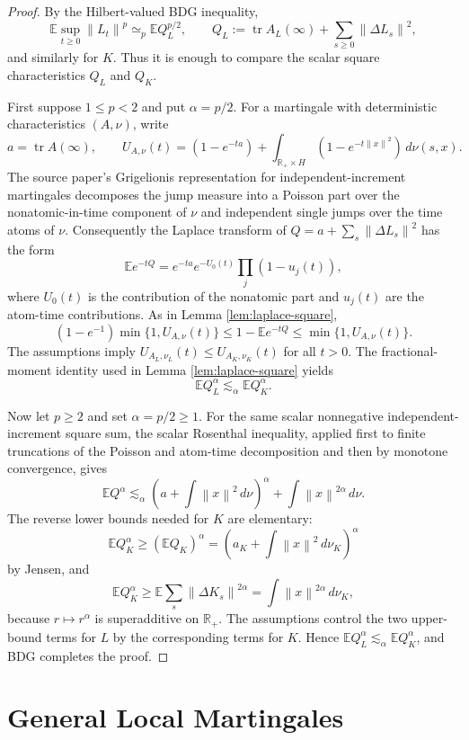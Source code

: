 \documentclass[11pt]{article}
\newcommand{\E}{\mathbb E}
\newcommand{\norm}[1]{\left\lVert #1\right\rVert}
\newcommand{\simequiv}{\simeq}
\begin{document}
\begin{proof}
By the Hilbert-valued BDG inequality,
\[
   \E\sup_{t\geq0}\norm{L_t}^p
   \simequiv_p
   \E Q_L^{p/2},
   \qquad
   Q_L:=\operatorname{tr}A_L(\infty)+\sum_{s\geq0}\norm{\Delta L_s}^2,
\]
and similarly for \(K\).  Thus it is enough to compare the scalar square
characteristics \(Q_L\) and \(Q_K\).

First suppose \(1\leq p<2\) and put \(\alpha=p/2\).  For a martingale with
deterministic characteristics \((A,\nu)\), write
\[
   a=\operatorname{tr}A(\infty),\qquad
   U_{A,\nu}(t)
   =
   (1-e^{-ta})
   +
   \int_{\mathbb R_+\times H}(1-e^{-t\norm{x}^2})\,d\nu(s,x).
\]
The source paper's Grigelionis representation for independent-increment
martingales decomposes the jump measure into a Poisson part over the
nonatomic-in-time component of \(\nu\) and independent single jumps over the
time atoms of \(\nu\).  Consequently the Laplace transform of
\(Q=a+\sum_s\norm{\Delta L_s}^2\) has the form
\[
  \E e^{-tQ}
  =
  e^{-ta}
  e^{-U_0(t)}
  \prod_j(1-u_j(t)),
\]
where \(U_0(t)\) is the contribution of the nonatomic part and \(u_j(t)\) are
the atom-time contributions.  As in Lemma \ref{lem:laplace-square},
\[
   (1-e^{-1})\min\{1,U_{A,\nu}(t)\}
   \leq
   1-\E e^{-tQ}
   \leq
   \min\{1,U_{A,\nu}(t)\}.
\]
The assumptions imply \(U_{A_L,\nu_L}(t)\leq U_{A_K,\nu_K}(t)\) for all
\(t>0\).  The fractional-moment identity used in Lemma
\ref{lem:laplace-square} yields
\[
   \E Q_L^\alpha \lesssim_\alpha \E Q_K^\alpha .
\]

Now let \(p\geq2\) and set \(\alpha=p/2\geq1\).  For the same scalar
nonnegative independent-increment square sum, the scalar Rosenthal inequality,
applied first to finite truncations of the Poisson and atom-time
decomposition and then by monotone convergence, gives
\[
   \E Q^\alpha
   \lesssim_\alpha
   \left(a+\int\norm{x}^2\,d\nu\right)^\alpha
   +
   \int\norm{x}^{2\alpha}\,d\nu .
\]
The reverse lower bounds needed for \(K\) are elementary:
\[
   \E Q_K^\alpha\geq
   \left(\E Q_K\right)^\alpha
   =
   \left(a_K+\int\norm{x}^2\,d\nu_K\right)^\alpha
\]
by Jensen, and
\[
   \E Q_K^\alpha
   \geq
   \E\sum_s\norm{\Delta K_s}^{2\alpha}
   =
   \int\norm{x}^{2\alpha}\,d\nu_K,
\]
because \(r\mapsto r^\alpha\) is superadditive on \(\mathbb R_+\).  The
assumptions control the two upper-bound terms for \(L\) by the corresponding
terms for \(K\).  Hence \(\E Q_L^\alpha\lesssim_\alpha\E Q_K^\alpha\), and
BDG completes the proof.
\end{proof}

\section*{General Local Martingales}
\end{document}
